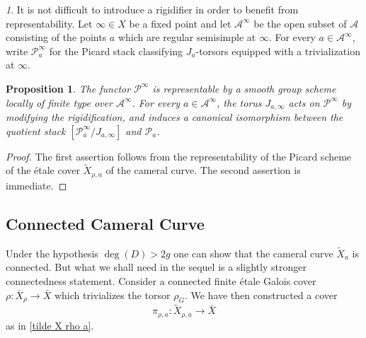 \documentclass[12pt,english]{smfart}
\numberwithin{equation}{subsection}
\newtheorem{proposition}[equation]{Proposition}
\theoremstyle{remark}
\newtheorem{numero}[equation]{}
\newcommand\calA{{\mathscr A}}
\newcommand\calP{{\mathscr P}}
\begin{document}
\begin{numero}\label{rigidificateur}
It is not difficult to introduce a rigidifier in order to benefit from representability. Let $\infty\in X$ be a fixed point and let $\calA^\infty$ be the open subset of $\calA$ consisting of the points $a$ which are regular semisimple at $\infty$. For every $a\in\calA^\infty$, write $\calP_a^\infty$ for the Picard stack classifying $J_a$-torsors equipped with a trivialization at $\infty$.
\end{numero}

\begin{proposition}\label{P infty representable}
The functor $\calP^\infty$ is representable by a smooth group scheme locally of finite type over $\calA^\infty$. For every $a\in\calA^\infty$, the torus $J_{a,\infty}$ acts on $\calP^\infty$ by modifying the rigidification, and induces a canonical isomorphism between the quotient stack $[\calP_a^\infty/J_{a,\infty}]$ and $\calP_a$.
\end{proposition}

\begin{proof}
The first assertion follows from the representability of the Picard scheme of the \'etale cover $\widetilde X_{\rho,a}$ of the cameral curve. The second assertion is immediate.
\end{proof}

\subsection{Connected Cameral Curve}\label{subsection : courbe camerale connexe}

Under the hypothesis $\deg(D)>2g$ one can show that the cameral curve $\widetilde X_a$ is connected. But what we shall need in the sequel is a slightly stronger connectedness statement. Consider a connected finite \'etale Galois cover $\rho:\bar X_\rho\rightarrow \bar X$ which trivializes the torsor $\rho_G$. We have then constructed a cover
$$\pi_{\rho,a}:\widetilde X_{\rho,a}\rightarrow \bar X$$
as in \ref{tilde X rho a}.
\end{document}
